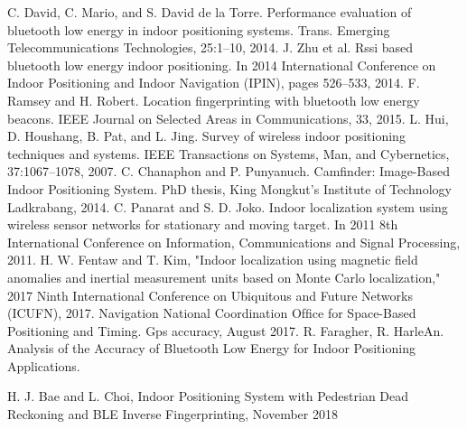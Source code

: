 \begin{thebibliography}{2}
C. David, C. Mario, and S. David de la Torre. Performance evaluation of bluetooth low energy in indoor positioning systems. Trans. Emerging Telecommunications Technologies, 25:1–10, 2014.
J. Zhu et al. Rssi based bluetooth low energy indoor positioning. In 2014 International Conference on Indoor Positioning and Indoor Navigation (IPIN), pages 526–533, 2014.
 F. Ramsey and H. Robert. Location fingerprinting with bluetooth low energy beacons. IEEE Journal on Selected Areas in Communications, 33, 2015.
L. Hui, D. Houshang, B. Pat, and L. Jing. Survey of wireless indoor positioning techniques and systems. IEEE Transactions on Systems, Man, and Cybernetics, 37:1067–1078, 2007.
C. Chanaphon and P. Punyanuch. Camfinder: Image-Based Indoor Positioning System. PhD thesis, King Mongkut’s Institute of Technology Ladkrabang, 2014.
C. Panarat and S. D. Joko. Indoor localization system using wireless sensor networks for stationary and moving target. In 2011 8th International Conference on Information, Communications and Signal Processing, 2011.
H. W. Fentaw and T. Kim, "Indoor localization using magnetic field anomalies and inertial measurement units based on Monte Carlo localization," 2017 Ninth International Conference on Ubiquitous and Future Networks (ICUFN), 2017.
Navigation National Coordination Ofﬁce for Space-Based Positioning and Timing. Gps accuracy, August 2017.
R. Faragher, R. HarleAn. Analysis of the Accuracy of Bluetooth Low Energy for Indoor Positioning Applications.

H. J. Bae and L. Choi, Indoor Positioning System with Pedestrian Dead Reckoning and BLE Inverse Fingerprinting, November 2018

\end{thebibliography}